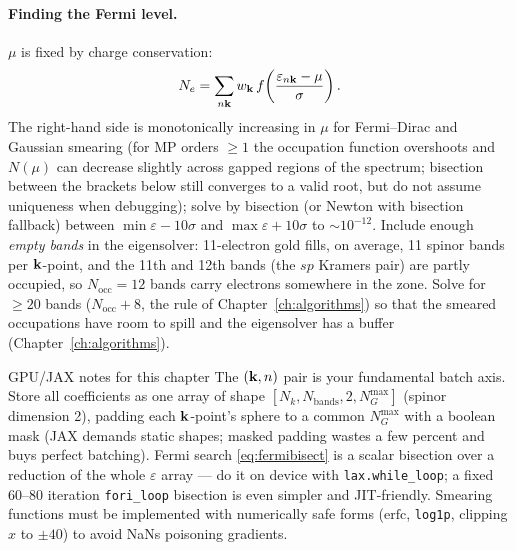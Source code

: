 \paragraph{Finding the Fermi level.} $\mu$ is fixed by charge conservation:
\begin{equation}
N_e = \sum_{n\mathbf{k}} w_{\mathbf{k}}\,
f\!\left(\frac{\varepsilon_{n\mathbf{k}} - \mu}{\sigma}\right).
\label{eq:fermibisect}
\end{equation}
The right-hand side is monotonically increasing in $\mu$ for Fermi--Dirac
and Gaussian smearing (for MP orders $\ge 1$ the occupation function
overshoots and $N(\mu)$ can decrease slightly across gapped regions of the
spectrum; bisection between the brackets below still converges to a valid
root, but do not assume uniqueness when debugging); solve by bisection
(or Newton with bisection fallback) between $\min \varepsilon - 10\sigma$ and
$\max\varepsilon + 10\sigma$ to $\sim 10^{-12}$. Include enough
\emph{empty bands} in the eigensolver: 11-electron gold fills, on average,
11 spinor bands per $\mathbf{k}$-point, and the 11th and 12th bands (the $sp$
Kramers pair) are partly occupied, so $N_{\mathrm{occ}} = 12$ bands carry
electrons somewhere in the zone. Solve for $\geq 20$ bands
($N_{\mathrm{occ}} + 8$, the rule of Chapter~\ref{ch:algorithms}) so that
the smeared occupations have room to spill and the eigensolver has a buffer
(Chapter~\ref{ch:algorithms}).

\begin{gpubox}{GPU/JAX notes for this chapter}
The $(\mathbf{k}, n)$ pair is your fundamental batch axis. Store all coefficients as
one array of shape $[N_k, N_{\mathrm{bands}}, 2, N_G^{\max}]$ (spinor
dimension 2), padding each $\mathbf{k}$-point's sphere to a common $N_G^{\max}$ with
a boolean mask (JAX demands static shapes; masked padding wastes a few
percent and buys perfect batching). Fermi search
\eqref{eq:fermibisect} is a scalar bisection over a reduction of the whole
$\varepsilon$ array --- do it on device with \texttt{lax.while\_loop}; a
fixed 60--80 iteration \texttt{fori\_loop} bisection is even simpler and
JIT-friendly. Smearing functions must be implemented with numerically safe
forms ($\mathrm{erfc}$, \texttt{log1p}, clipping $x$ to $\pm 40$) to avoid
NaNs poisoning gradients.
\end{gpubox}
